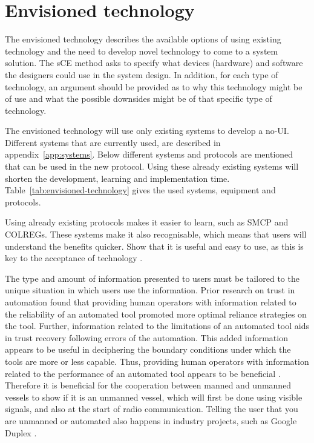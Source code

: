 \section{Envisioned technology}
The envisioned technology describes the available options of using existing technology and the need to develop novel technology to come to a system solution. The sCE method asks to specify what devices (hardware) and software the designers could use in the system design. In addition, for each type of technology, an argument should be provided as to why this technology might be of use and what the possible downsides might be of that specific type of technology.

The envisioned technology will use only existing systems to develop a \ac{no-UI}. Different systems that are currently used, are described in appendix~\ref{app:systems}. Below different systems and protocols are mentioned that can be used in the new protocol. Using these already existing systems will shorten the development, learning and implementation time. Table~\ref{tab:envisioned-technology} gives the used systems, equipment and protocols.

Using already existing protocols makes it easier to learn, such as \acf{SMCP} and \ac{COLREGs}. These systems make it also recognisable, which means that users will understand the benefits quicker. Show that it is useful and easy to use, as this is key to the acceptance of technology \cite{Davis1989}.

The type and amount of information presented to users must be tailored to the unique situation in which users use the information. Prior research on trust in automation found that providing human operators with information related to the reliability of an automated tool promoted more optimal reliance strategies on the tool. Further, information related to the limitations of an automated tool aids in trust recovery following errors of the automation. This added information appears to be useful in deciphering the boundary conditions under which the tools are more or less capable. Thus, providing human operators with information related to the performance of an automated tool appears to be beneficial \cite{Lyons2014}. Therefore it is beneficial for the cooperation between manned and unmanned vessels to show if it is an unmanned vessel, which will first be done using visible signals, and also at the start of radio communication. Telling the user that you are unmanned or automated also happens in industry projects, such as Google Duplex \cite{Nieva2018}.

